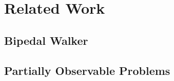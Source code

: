 \section{Related Work}
\label{sec:relatedwork}

\subsection{Bipedal Walker}

\subsection{Partially Observable Problems}

